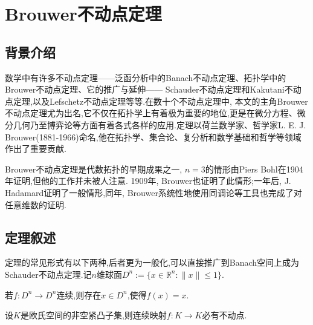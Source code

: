 \documentclass[main]{subfiles}
\newcommand{\mr}{\mathbb{R}}
\renewcommand{\leq}{\leqslant}
\begin{document}
\renewcommand{\filename}{14. Brouwer不动点定理}%
\section{Brouwer不动点定理}
\subsection{背景介绍}
数学中有许多不动点定理——泛函分析中的Banach不动点定理、拓扑学中的Brouwer不动点定理、它的推广与延伸—— Schauder不动点定理和Kakutani不动点定理,以及Lefschetz不动点定理等等.在数十个不动点定理中, 本文的主角Brouwer不动点定理尤为出名,它不仅在拓扑学上有着极为重要的地位,更是在微分方程、微分几何乃至博弈论等方面有着各式各样的应用.定理以荷兰数学家、哲学家L. E. J. Brouwer(1881-1966)命名,他在拓扑学、集合论、复分析和数学基础和哲学等领域作出了重要贡献.

Brouwer不动点定理是代数拓扑的早期成果之一, $n=3$的情形由Piers Bohl在1904年证明,但他的工作并未被人注意. 1909年, Brouwer也证明了此情形;一年后, J. Hadamard证明了一般情形,同年, Brouwer系统性地使用同调论等工具也完成了对任意维数的证明.
\subsection{定理叙述}
定理的常见形式有以下两种,后者更为一般化,可以直接推广到Banach空间上成为Schauder不动点定理.记$n$维球面$D^n:=\{x\in\mr^n:\|x\|\leq1\}$.
\begin{theorem}\label{thm:1}
	若$f:D^n\to D^n$连续,则存在$x\in D^n$,使得$f(x)=x$.
\end{theorem}
\begin{theorem}\label{thm:2}
	设$K$是欧氏空间的非空紧凸子集,则连续映射$f:K\to K$必有不动点.
\end{theorem}
\end{document}
